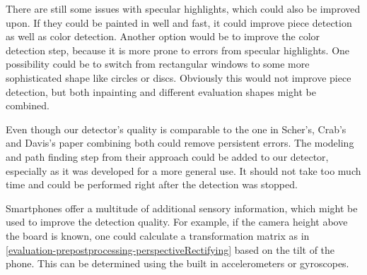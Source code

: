 There are still some issues with specular highlights, which could also be improved upon. If they could be painted in well and fast, it could improve piece detection as well as color detection. Another option would be to improve the color detection step, because it is more prone to errors from specular highlights. One possibility could be to switch from rectangular windows to some more sophisticated shape like circles or discs. Obviously this would not improve piece detection, but both inpainting and different evaluation shapes might be combined.

Even though our detector's quality is comparable to the one in Scher's, Crab's and Davis's paper \cite{scher2008making} combining both could remove persistent errors. The modeling and path finding step from their approach could be added to our detector, especially as it was developed for a more general use. It should not take too much time and could be performed right after the detection was stopped.

Smartphones offer a multitude of additional sensory information, which might be used to improve the detection quality. For example, if the camera height above the board is known, one could calculate a transformation matrix as in \autoref{evaluation-prepostprocessing-perspectiveRectifying} based on the tilt of the phone. This can be determined using the built in accelerometers or gyroscopes.
